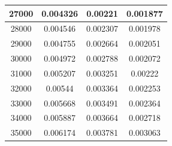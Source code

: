 \begin{center}
\begin{tabular}{| c | c | c | c |}
27000 & 0.004326 & 0.00221 & 0.001877 \\ \hline
28000 & 0.004546 & 0.002307 & 0.001978 \\ \hline
29000 & 0.004755 & 0.002664 & 0.002051 \\ \hline
30000 & 0.004972 & 0.002788 & 0.002072 \\ \hline
31000 & 0.005207 & 0.003251 & 0.00222 \\ \hline
32000 & 0.00544 & 0.003364 & 0.002253 \\ \hline
33000 & 0.005668 & 0.003491 & 0.002364 \\ \hline
34000 & 0.005887 & 0.003664 & 0.002718 \\ \hline
35000 & 0.006174 & 0.003781 & 0.003063 \\ \hline
\hline
\end{tabular}
\end{center}
